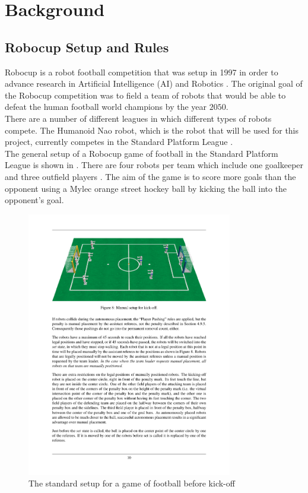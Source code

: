 \documentclass{report}
\begin{document}
\section{Background}
\label{sec:background}

\subsection{Robocup Setup and Rules}
\label{sec:robocupRules}
Robocup is a robot football competition that was setup in 1997 in order to advance research in Artificial Intelligence (AI) and Robotics \cite{Robocup}. The original goal of the Robocup competition was to field a team of robots that would be able to defeat the human football world champions by the year $2050$.\\

There are a number of different leagues in which different types of robots compete. The Humanoid Nao robot, which is the robot that will be used for this project, currently competes in the Standard Platform League \cite{StandardPlatform}.\\

The general setup of a Robocup game of football in the Standard Platform League is shown in . There are four robots per team which include one goalkeeper and three outfield players \cite{Rules}. The aim of the game is to score more goals than the opponent using a Mylec orange street hockey ball by kicking the ball into the opponent's goal.\\

\begin{figure}[h!] 
  \centering
    \includegraphics[width=0.8\textwidth]{../Drawings/robocup/NaoField.pdf}
    \caption{The standard setup for a game of football before kick-off \cite{Rules}}
    \label{fig:naofield}
\end{figure}
\end{document}
